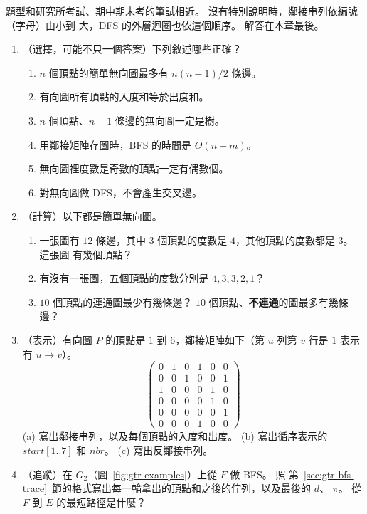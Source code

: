 題型和研究所考試、期中期末考的筆試相近。 沒有特別說明時，鄰接串列依編號（字母）由小到
大，DFS 的外層迴圈也依這個順序。 解答在本章最後。

\begin{enumerate}
\item \label{q:gtr-facts}（選擇，可能不只一個答案）下列敘述哪些正確？
\begin{enumerate}
\item $n$ 個頂點的簡單無向圖最多有 $n(n-1)/2$ 條邊。
\item 有向圖所有頂點的入度和等於出度和。
\item $n$ 個頂點、$n - 1$ 條邊的無向圖一定是樹。
\item 用鄰接矩陣存圖時，BFS 的時間是 $\Theta(n + m)$。
\item 無向圖裡度數是奇數的頂點一定有偶數個。
\item 對無向圖做 DFS，不會產生交叉邊。
\end{enumerate}

\item \label{q:gtr-degree}（計算）以下都是簡單無向圖。
\begin{enumerate}
\item 一張圖有 $12$ 條邊，其中 $3$ 個頂點的度數是 $4$，其他頂點的度數都是 $3$。 這張圖
有幾個頂點？
\item 有沒有一張圖，五個頂點的度數分別是 $4, 3, 3, 2, 1$？
\item $10$ 個頂點的連通圖最少有幾條邊？ $10$ 個頂點、\textbf{不連通}的圖最多有幾條邊？
\end{enumerate}

\item \label{q:gtr-repr}（表示）有向圖 $P$ 的頂點是 $1$ 到 $6$，鄰接矩陣如下（第 $u$ 列第 $v$
行是 $1$ 表示有 $u \to v$）。
\[
\begin{pmatrix}
0 & 1 & 0 & 1 & 0 & 0 \\
0 & 0 & 1 & 0 & 0 & 1 \\
1 & 0 & 0 & 0 & 1 & 0 \\
0 & 0 & 0 & 0 & 1 & 0 \\
0 & 0 & 0 & 0 & 0 & 1 \\
0 & 0 & 0 & 1 & 0 & 0
\end{pmatrix}
\]
(a) 寫出鄰接串列，以及每個頂點的入度和出度。 (b) 寫出循序表示的 $\mathit{start}[1..7]$ 和
$\mathit{nbr}$。 (c) 寫出反鄰接串列。

\item \label{q:gtr-bfs-f}（追蹤）在 $G_2$（圖~\ref{fig:gtr-examples}）上從 $F$ 做 BFS。 照
第~\ref{sec:gtr-bfs-trace}~節的格式寫出每一輪拿出的頂點和之後的佇列，以及最後的 $d$、
$\pi$。 從 $F$ 到 $E$ 的最短路徑是什麼？


\end{enumerate}
